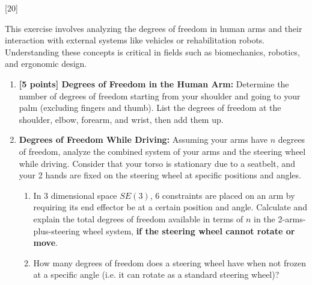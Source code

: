 \documentclass{16384_doc}
\begin{document}
\begin{questions}
\begin{enumerate} [label=\alph*.]
    \end{enumerate}

[20]

This exercise involves analyzing the degrees of freedom in human arms and their interaction with external systems like vehicles or rehabilitation robots. Understanding these concepts is critical in fields such as biomechanics, robotics, and ergonomic design.


\begin{enumerate}[label=\alph*.]
    \item \textbf{[5 points] Degrees of Freedom in the Human Arm:}
    Determine the number of degrees of freedom starting from your shoulder and going to your palm (excluding fingers and thumb). List the degrees of freedom at the shoulder, elbow, forearm, and wrist, then add them up.


    \begin{tcolorbox}[height=3cm]
    \end{tcolorbox}

    \item \textbf{Degrees of Freedom While Driving:}
    Assuming your arms have $n$ degrees of freedom, analyze the combined system of your arms and the steering wheel while driving. Consider that your torso is stationary due to a seatbelt, and your 2 hands are fixed on the steering wheel at specific positions and angles. 

    \begin{enumerate} [label=(\roman*)]
        \item \text{[2 points]} In 3 dimensional space $SE(3)$, 6 constraints are placed on an arm by requiring its end effector be at a certain position and angle. Calculate and explain the total degrees of freedom available in terms of $n$ in the 2-arms-plus-steering wheel system, \textbf{if the steering wheel cannot rotate or move}.
        \begin{tcolorbox}[height=3cm]
        \end{tcolorbox}

        \item \text{[1 points]} How many degrees of freedom does a steering wheel have when not frozen at a specific angle (i.e. it can rotate as a standard steering wheel)? 
        \begin{tcolorbox}[height=3cm]
        \end{tcolorbox}


\end{enumerate}
\end{enumerate}
\end{questions}
\end{document}
